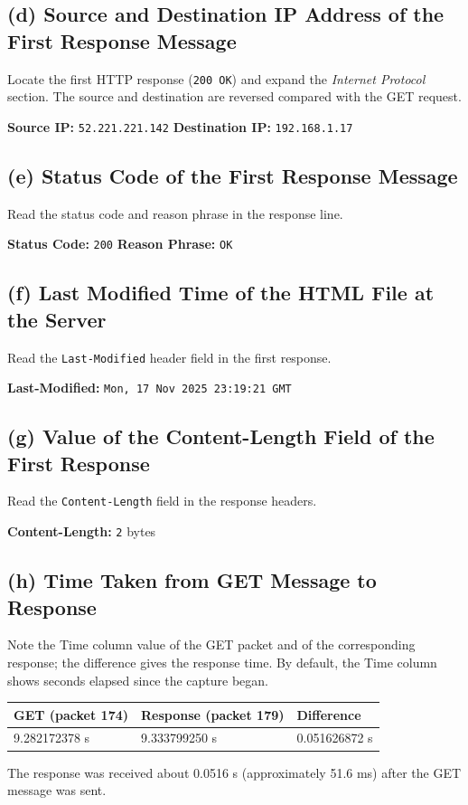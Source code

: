\documentclass[12pt, a4paper]{report}
\begin{document}
\subsection*{(d) Source and Destination IP Address of the First Response Message}
Locate the first HTTP response (\texttt{200 OK}) and expand the \textit{Internet Protocol} section. The source and destination are reversed compared with the GET request.

\textbf{Source IP:} \texttt{52.221.221.142} \hfill \textbf{Destination IP:} \texttt{192.168.1.17}

\subsection*{(e) Status Code of the First Response Message}
Read the status code and reason phrase in the response line.

\textbf{Status Code:} \texttt{200} \hfill \textbf{Reason Phrase:} \texttt{OK}

\subsection*{(f) Last Modified Time of the HTML File at the Server}
Read the \texttt{Last-Modified} header field in the first response.

\textbf{Last-Modified:} \texttt{Mon, 17 Nov 2025 23:19:21 GMT}

\subsection*{(g) Value of the Content-Length Field of the First Response}
Read the \texttt{Content-Length} field in the response headers.

\textbf{Content-Length:} \texttt{2} bytes

\subsection*{(h) Time Taken from GET Message to Response}
Note the Time column value of the GET packet and of the corresponding response; the difference gives the response time. By default, the Time column shows seconds elapsed since the capture began.

\begin{center}
	\begin{tabular}{|l|l|l|}
		\hline
		\textbf{GET (packet 174)} & \textbf{Response (packet 179)} & \textbf{Difference} \\ \hline
		9.282172378 s & 9.333799250 s & 0.051626872 s \\ \hline
	\end{tabular}
\end{center}
The response was received about 0.0516 s (approximately 51.6 ms) after the GET message was sent.
\end{document}
